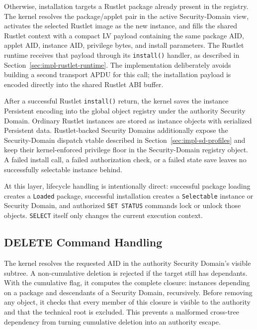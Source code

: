 Otherwise, installation targets a Rustlet package already present in the
registry. The kernel resolves the package/applet pair in the active
Security-Domain view, activates the selected Rustlet image as the new instance,
and fills the shared Rustlet context with a compact LV payload containing the
same package AID, applet AID, instance AID, privilege bytes, and install
parameters. The Rustlet runtime receives that payload through its
\texttt{install()} handler, as described in
Section~\ref{sec:impl-rustlet-runtime}. The implementation deliberately avoids
building a second transport APDU for this call; the installation payload is
encoded directly into the shared Rustlet ABI buffer.

After a successful Rustlet \texttt{install()} return, the kernel saves the
instance Persistent encoding into the global object registry under the authority Security
Domain. Ordinary Rustlet instances are stored as instance objects with
serialized Persistent data. Rustlet-backed Security Domains additionally expose the
Security-Domain dispatch vtable described in Section~\ref{sec:impl-sd-profiles}
and keep their kernel-enforced privilege floor in the Security-Domain registry
object. A failed install call, a failed authorization check, or a failed state
save leaves no successfully selectable instance behind.

At this layer, lifecycle handling is intentionally direct: successful package
loading creates a \texttt{Loaded} package, successful installation creates a
\texttt{Selectable} instance or Security Domain, and authorized
\texttt{SET STATUS} commands lock or unlock those objects. \texttt{SELECT}
itself only changes the current execution context.

\subsection{DELETE Command Handling}
\label{sec:impl-delete}

The kernel resolves the requested AID in the authority Security Domain's
visible subtree. A non-cumulative deletion is rejected if the target still
has dependants. With the cumulative flag, it computes the complete closure:
instances depending on a package and descendants of a Security Domain,
recursively. Before removing any object, it checks that every member of this
closure is visible to the authority and that the technical root is excluded.
This prevents a malformed cross-tree dependency from turning cumulative
deletion into an authority escape.

